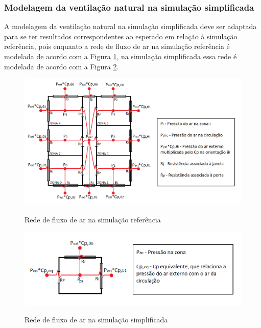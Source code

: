 \documentclass[brazil,hardcopy,openany,a5paper]{ufscthesis}
\begin{document}
		\subsubsection{Modelagem da ventilação natural na simulação simplificada}
		
		A modelagem da ventilação natural na simulação simplificada deve ser adaptada para se ter resultados correspondentes ao esperado em relação à simulação referência, pois enquanto a rede de fluxo de ar na simulação referência é modelada de acordo com a Figura \ref{fig:AFN_ref}, na simulação simplificada essa rede é modelada de acordo com a Figura \ref{fig:AFN_sz}.	
		
		\begin{figure}[h]
			\centering
			\caption{Rede de fluxo de ar na simulação referência}
				\includegraphics[width=1\linewidth]{img/AFN_ref.png}
				\label{fig:AFN_ref}
		\end{figure}	
		
		\begin{figure}[h]
		\centering
		\caption{Rede de fluxo de ar na simulação simplificada}
			\includegraphics[width=1\linewidth]{img/AFN_sz.png}
			\label{fig:AFN_sz}
		\end{figure}
		
\end{document}
